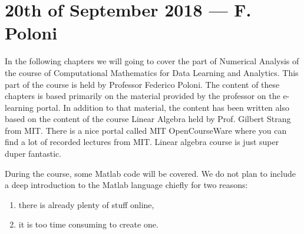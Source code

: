 \documentclass[computationalMathematics.tex]{subfiles}
\begin{document}
\chapter{20th of September 2018 --- F. Poloni}

\par In the following chapters we will going to cover the part of Numerical Analysis of the course of Computational Mathematics for Data Learning and Analytics. This part of the course is held by Professor Federico Poloni. The content of these chapters is based primarily on the material provided by the professor on the e-learning portal. In addition to that material, the content has been written also based on the content of the course Linear Algebra held by Prof. Gilbert Strang from MIT. There is a nice portal called MIT OpenCourseWare where you can find a lot of recorded lectures from MIT. Linear algebra course is just super duper fantastic.
\par During the course, some Matlab code will be covered. We do not plan to include a deep introduction to the Matlab language chiefly for two reasons:
\begin{enumerate}
    \item there is already plenty of stuff online,
    \item it is too time consuming to create one.
\end{enumerate}
\end{document}
